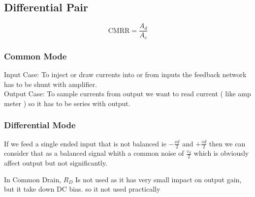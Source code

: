 \subsection{Differential Pair}
$$ \text{CMRR} = \frac{A_d}{A_c}$$
\subsubsection{Common Mode}
Input Case: To inject or draw currents into or from inputs the feedback network has to be shunt with amplifier.\\
Output Case: To sample currents from output we want to read current ( like amp meter ) so it has to be series with output.
\subsubsection{Differential Mode}
If we feed a single ended input that is not balanced ie $-\frac{vd}{2}$ and $+\frac{vd}{2}$ then we can consider that as a balanced signal whith a common noise of $\frac{v_d}{2}$ which is obviously affect output but not significantly.
\par
\setlength{\parindent}{0.5cm} %
In Common Drain, $R_D$ Is not used as it has very small impact on output gain, but it take down DC bias. so it not used practically
\lipsum[2]
\setlength{\parindent}{0.0cm} 
